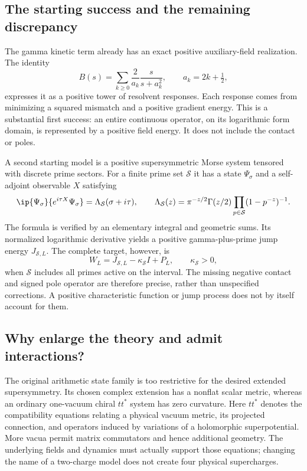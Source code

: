\subsection{The starting success and the remaining discrepancy}
The gamma kinetic term already has an exact positive auxiliary-field realization. The identity
\[
B(s)=\sum_{k\ge0}\frac2{a_k}\frac{s}{s+a_k^2},\qquad a_k=2k+\tfrac12,
\]
expresses it as a positive tower of resolvent responses. Each response comes from minimizing a squared mismatch and a positive gradient energy. This is a substantial first success: an entire continuous operator, on its logarithmic form domain, is represented by a positive field energy. It does not include the contact or poles.

A second starting model is a positive supersymmetric Morse system tensored with discrete prime sectors. For a finite prime set $\mathcal S$ it has a state $\Psi_\sigma$ and a self-adjoint observable $X$ satisfying
\begin{equation}\label{intro:amplitude}
\ip{\Psi_\sigma}{e^{i\tau X}\Psi_\sigma}
=\Lambda_{\mathcal S}(\sigma+i\tau),\qquad
\Lambda_{\mathcal S}(z)=\pi^{-z/2}\Gamma(z/2)
\prod_{p\in\mathcal S}(1-p^{-z})^{-1}.
\end{equation}
The formula is verified by an elementary integral and geometric sums. Its normalized logarithmic derivative yields a positive gamma-plus-prime jump energy $J_{\mathcal S,L}$. The complete target, however, is
\begin{equation}\label{intro:missing}
W_L=J_{\mathcal S,L}-\kappa_{\mathcal S}I+P_L,
\qquad \kappa_{\mathcal S}>0,
\end{equation}
when $\mathcal S$ includes all primes active on the interval. The missing negative contact and signed pole operator are therefore precise, rather than unspecified corrections. A positive characteristic function or jump process does not by itself account for them.

\subsection{Why enlarge the theory and admit interactions?}
The original arithmetic state family is too restrictive for the desired extended supersymmetry. Its chosen complex extension has a nonflat scalar metric, whereas an ordinary one-vacuum chiral $tt^*$ system has zero curvature. Here $tt^*$ denotes the compatibility equations relating a physical vacuum metric, its projected connection, and operators induced by variations of a holomorphic superpotential. More vacua permit matrix commutators and hence additional geometry. The underlying fields and dynamics must actually support those equations; changing the name of a two-charge model does not create four physical supercharges.

